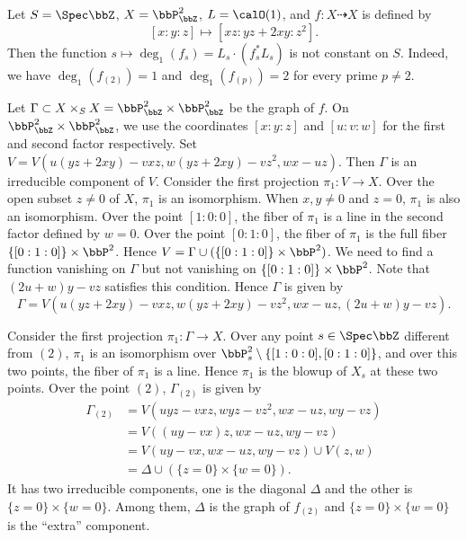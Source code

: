 \begin{example}\label{eg:non-continuity-of-mixed-degrees}
	Let $S = \Spec \bbZ$, $X = \bbP^2_{\bbZ}$, $L = \calO(1)$, and $f: X \dashrightarrow X$ is defined by
	\[ [x:y:z] \mapsto [xz:yz+2xy:z^2]. \]
	Then the function $s \mapsto \deg_1(f_s) = L_s \cdot (f_s^*L_s)$ is not constant on $S$.
	Indeed, we have $\deg_1(f_{(2)}) = 1$ and $\deg_1(f_{(p)}) = 2$ for every prime $p \neq 2$.

	Let $\Gamma \subset X \times_S X = \bbP^2_{\bbZ} \times \bbP^2_{\bbZ}$ be the graph of $f$.
	On $\bbP^2_{\bbZ} \times \bbP^2_{\bbZ}$, we use the coordinates $[x:y:z]$ and $[u:v:w]$ for the first and second factor respectively.
	Set $V = V(u(yz+2xy) - vxz, w(yz+2xy) - vz^2, wx - uz)$.
	Then $\Gamma$ is an irreducible component of $V$.
	Consider the first projection $\pi_1: V \to X$.
	Over the open subset $z \neq 0$ of $X$, $\pi_1$ is an isomorphism.
	When $x,y \neq 0$ and $z = 0$, $\pi_1$ is also an isomorphism.
	Over the point $[1:0:0]$, the fiber of $\pi_1$ is a line in the second factor defined by $w = 0$.
	Over the point $[0:1:0]$, the fiber of $\pi_1$ is the full fiber $\{[0:1:0]\} \times \bbP^2$.
	Hence $V = \Gamma \cup (\{[0:1:0]\} \times \bbP^2)$.
	We need to find a function vanishing on $\Gamma$ but not vanishing on $\{[0:1:0]\} \times \bbP^2$.
	Note that $(2u+w)y-vz$ satisfies this condition.
	Hence $\Gamma$ is given by
	\[ \Gamma = V(u(yz+2xy) - vxz, w(yz+2xy) - vz^2, wx - uz, (2u+w)y-vz). \]

	Consider the first projection $\pi_1: \Gamma \to X$.
	Over any point $s \in \Spec \bbZ$ different from $(2)$, $\pi_1$ is an isomorphism over $\bbP^2_s \setminus \{[1:0:0],[0:1:0]\}$, and over this two points, the fiber of $\pi_1$ is a line.
	Hence $\pi_1$ is the blowup of $X_s$ at these two points.
	Over the point $(2)$, $\Gamma_{(2)}$ is given by
	\begin{align*}
		\Gamma_{(2)} & =  V(uyz - vxz, wyz - vz^2, wx - uz, wy-vz) \\
		             & = V((uy-vx)z, wx - uz, wy-vz)               \\
		             & = V(uy-vx, wx - uz, wy-vz) \cup V(z, w)     \\
		             & = \Delta \cup (\{z=0\} \times \{w=0\}).
	\end{align*}
	It has two irreducible components, one is the diagonal $\Delta$ and the other is $\{z=0\} \times \{w=0\}$.
	Among them, $\Delta$ is the graph of $f_{(2)}$ and $\{z=0\} \times \{w=0\}$ is the ``extra'' component.
\end{example}


